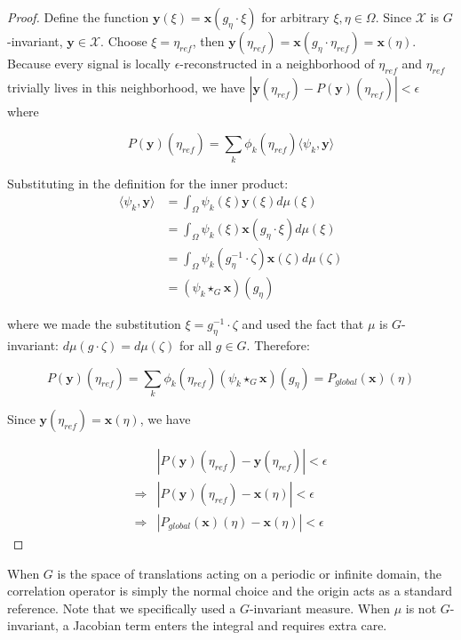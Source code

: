 \documentclass[twocolumn,10pt]{article}
\begin{document}
\begin{proof}
Define the function $\mathbf y(\xi) = \mathbf x(g_\eta\cdot  \xi)$ for arbitrary $\xi, \eta \in \Omega$. Since $\mathcal{X}$ is $G$-invariant, $\mathbf y \in \mathcal X$. Choose $\xi = \eta_{\textit{ref}}$, then  $\mathbf y(\eta_{\textit{ref}}) = \mathbf x(g_\eta\cdot  \eta_{\textit{ref}}) = \mathbf x(\eta)$. 
%
Because every signal is locally $\epsilon$-reconstructed in a neighborhood of $\eta_{\textit{ref}}$ and $\eta_{\textit{ref}}$ trivially lives in this neighborhood, we have $|\mathbf y(\eta_{\textit{ref}})  -  P (\mathbf{y})(\eta_{\textit{ref}})| < \epsilon$ where 

$$
 P (\mathbf{y})(\eta_{\textit{ref}})   
    = \sum_k \phi_k(\eta_{\textit{ref}}) \langle \psi_k, \mathbf y\rangle
$$

\noindent Substituting in the definition for the inner product: 
\begin{align*}
    \langle \psi_k, \mathbf y \rangle 
    &= \int_\Omega \psi_k(\xi) \mathbf y(\xi) d\mu(\xi)
    \\
    &= \int_\Omega \psi_k(\xi) \mathbf x(g_\eta \cdot \xi) d\mu(\xi) \\
    &= \int_\Omega \psi_k(g_\eta^{-1} \cdot \zeta) \mathbf x(\zeta) d\mu(\zeta) \\
    &= (\psi_k \star_G \mathbf x)(g_\eta)
\end{align*}

\noindent where we made the substitution $\xi = g_\eta^{-1} \cdot \zeta$ and used the fact that $\mu$ is $G$-invariant: $d\mu(g\cdot \zeta) = d\mu(\zeta)$ for all $g\in G$. Therefore:


$$
P(\mathbf y)(\eta_{\textit{ref}})= \sum_k \phi_k(\eta_{\textit{ref}}) (\psi_k \star_G \mathbf x)(g_\eta) = P_{\textit{global}}(\mathbf{x})(\eta)
$$

Since $\mathbf y(\eta_{\textit{ref}}) = \mathbf{x}(\eta)$, we have 

\begin{align*}
    &|P(\mathbf{y})(\eta_{\textit{ref}}) - \mathbf{y}(\eta_{\textit{ref}})| < \epsilon \\
    \Rightarrow 
    &|P(\mathbf{y})(\eta_{\textit{ref}}) - \mathbf{x}(\eta)| < \epsilon \\
    \Rightarrow
    &|P_{\textit{global}}(\mathbf{x})(\eta) - \mathbf{x}(\eta)| < \epsilon 
\end{align*}

\end{proof}

When $G$ is the space of translations acting on a periodic or infinite domain, the correlation operator is simply the normal choice and the origin acts as a standard reference. Note that we specifically used a $G$-invariant measure. When $\mu$ is not $G$-invariant, a Jacobian term enters the integral and requires extra care.
\end{document}
